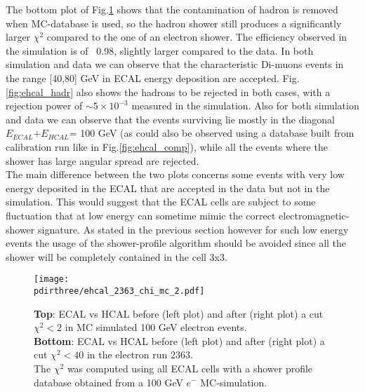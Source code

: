 The bottom plot of Fig.\ref{fig:ehcal_elec} shows that the
contamination of hadron is removed when MC-database is used, so
the hadron shower still produces a significantly larger $\chi^{2}$
compared to the one of an electron shower. The efficiency
observed in the simulation is of ~0.98, slightly larger compared to the data. 
In both simulation and data we can observe that the characteristic
Di-muons events in the range [40,80] GeV in ECAL energy
deposition are accepted.
Fig.\ref{fig:ehcal_hadr} also shows the hadrons to be rejected in both
cases, with a rejection power of $\sim 5\times 10^{-3}$ measured in the
simulation. Also for both simulation and data we can observe that the
events surviving lie mostly in the diagonal $E_{ECAL}$+$E_{HCAL}$= 100
GeV (as could also be observed using a database built from calibration run like in Fig.\ref{fig:ehcal_comp}), while all the events where the shower has large angular spread are rejected.
\\
The main difference between the two plots concerns some events with very low energy deposited in the ECAL that are accepted in the data but not in the simulation. This would suggest that the ECAL cells are subject to some fluctuation that at low energy can sometime mimic the correct electromagnetic-shower signature. As stated in the previous section however for such low energy events the usage of the shower-profile algorithm should be avoided since all the shower will be completely contained in the cell 3x3.\\

\fi


\begin{figure}[h!]
  \begin{center}
    \texttt{[image: \\pdirthree/ehcal\_2363\_chi\_mc\_2.pdf]}
  \end{center}
  \caption{\textbf{Top}: ECAL vs HCAL before (left plot) and
    after (right plot) a cut
    $\chi^2<2$ in MC simulated 100 GeV electron events. \\
    \textbf{Bottom}: ECAL vs HCAL before (left plot) and after (right
    plot) a cut
    $\chi^2<40$ in the electron run 2363.\\
    The $\chi^2$ was computed using all ECAL cells with a shower
    profile database obtained from a 100 GeV $e^-$ MC-simulation. }
  \label{fig:ehcal_elec}
\end{figure}

